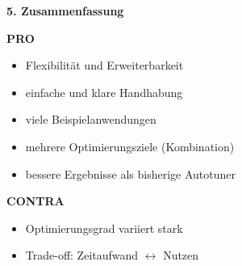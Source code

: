   \begin{frame}
  \textbf{5. Zusammenfassung} \newline
  
   \textbf{PRO\\}
   \begin{itemize}
      \item Flexibilität und Erweiterbarkeit

      \item einfache und klare Handhabung
      
      \item viele Beispielanwendungen
      
      \item mehrere Optimierungsziele (Kombination)

      \item bessere Ergebnisse als bisherige Autotuner
        
     \end{itemize}

    \text{} %
      
   \textbf{CONTRA\\}
    \begin{itemize}
      \item Optimierungsgrad variiert stark
      
      \item Trade-off: Zeitaufwand $\leftrightarrow$ Nutzen
      \end{itemize}
    
  \end{frame}
  
  
\begingroup
{}

